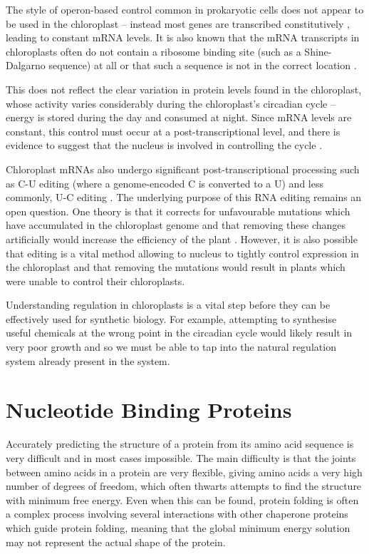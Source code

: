 The style of operon-based control common in prokaryotic cells does not appear 
to be used in the chloroplast -- instead most genes are 
transcribed constitutively \citep{Sugita1996}, leading to constant mRNA levels.
It is also known that the mRNA transcripts in chloroplasts often do not 
contain a ribosome binding site (such as a Shine-Dalgarno sequence) at all or 
that such a sequence is not in the correct 
location \citep{Sugiura1998,Zerges2000}.

This does not reflect the clear variation in protein levels found in the 
chloroplast, whose activity varies considerably during the chloroplast's 
circadian cycle -- energy is stored during the day and consumed at night.
Since mRNA levels are constant, this control must occur at a 
post-transcriptional level, and there is evidence to suggest that the nucleus
is involved in controlling the cycle \citep{Matsuo2006}.

Chloroplast mRNAs also undergo significant post-transcriptional processing such
as C-U editing (where a genome-encoded C is converted to a U) and less 
commonly, U-C editing \citep{Castandet2011}.
The underlying purpose of this RNA editing remains an open question. 
One theory is that it corrects for unfavourable mutations which have
accumulated in the chloroplast genome and that removing these changes 
artificially would increase the efficiency of the plant \citep{Fujii2011}.
However, it is also possible that editing is a vital method allowing to nucleus
to tightly control expression in the chloroplast and that removing the 
mutations would result in plants which were unable to control their 
chloroplasts.

Understanding regulation in chloroplasts is a vital step before they can be
effectively used for synthetic biology.
For example, attempting to synthesise useful chemicals at the wrong point in 
the circadian cycle would likely result in very poor growth and so we must be
able to tap into the natural regulation system already present in the system.

\section{Nucleotide Binding Proteins}
\label{sec:intro_binding}

Accurately predicting the structure of a protein from its amino acid sequence 
is very difficult and in most cases impossible.
The main difficulty is that the joints between amino acids in a protein are
very flexible, giving amino acids a very high number of degrees of freedom,
which often thwarts attempts to find the structure with minimum free energy.
Even when this can be found, protein folding is often a complex process
involving several interactions with other chaperone proteins which guide
protein folding, meaning that the global minimum energy solution may not 
represent the actual shape of the protein.

